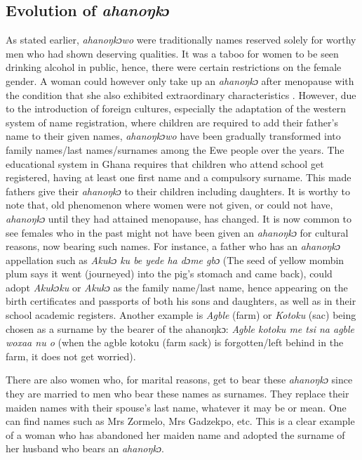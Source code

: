 \documentclass[output=paper]{langscibook}
\begin{document}
\subsection{Evolution of {\textit{ahanoŋkɔ}}}

As stated earlier, {\textit{ahanoŋkɔwo}} were traditionally names reserved solely for worthy men who had shown deserving qualities. It was a taboo for women to be seen drinking alcohol in public, hence, there were certain restrictions on the female gender. A woman could however only take up an {\textit{ahanoŋkɔ}} after menopause with the condition that she also exhibited extraordinary characteristics \citep{Egblewogbe1977Ewe}. However, due to the introduction of foreign cultures, especially the adaptation of the western system of name registration, where children are required to add their father’s name to their given names, {\textit{ahanoŋkɔwo}} have been gradually transformed into family names/last names/surnames among the Ewe people over the years. The educational system in Ghana requires that children who attend school get registered, having at least one first name and a compulsory surname. This made fathers give their {\textit{ahanoŋkɔ}} to their children including daughters. It is worthy to note that, old phenomenon where women were not given, or could not have,  {\textit{ahanoŋkɔ}} until they had attained menopause, has changed. It is now common to see females who in the past might not have been given an {\textit{ahanoŋkɔ}} for cultural reasons, now bearing such names. For instance, a father who has an {\textit{ahanoŋkɔ}} appellation such as \textit{Akukɔ ku be yede ha dɔme gbɔ} (The seed of yellow mombin plum says it went (journeyed) into the pig’s stomach and came back), could adopt {\textit{Akukɔku}} or {\textit{Akukɔ}} as the family name/last name, hence appearing on the birth certificates and passports of both his sons and daughters, as well as in their school academic registers. Another example is {\textit{Agble}} (farm) or {\textit{Kotoku}} (sac) being chosen as a surname by the bearer of the ahanoŋkɔ: {\textit{Agble kotoku me tsi na agble woxaa nu o}} (when the agble kotoku (farm sack) is forgotten/left behind in the farm, it does not get worried).

There are also women who, for marital reasons, get to bear these {\textit{ahanoŋkɔ}} since they are married to men who bear these names as surnames. They replace their maiden names with their spouse’s last name, whatever it may be or mean. One can find names such as Mrs Zormelo, Mrs Gadzekpo, etc. This is a clear example of a woman who has abandoned her maiden name and adopted the surname of her husband who bears an {\textit{ahanoŋkɔ}}.
\end{document}
